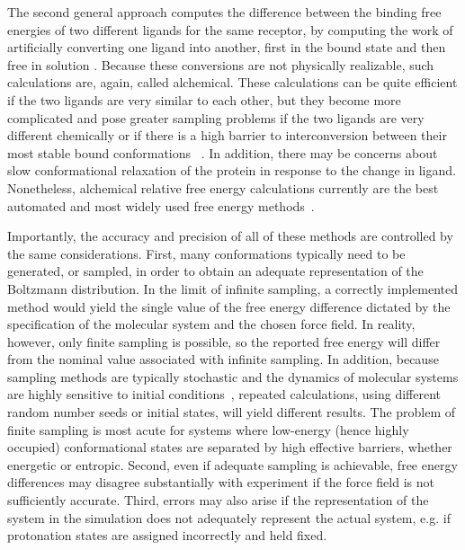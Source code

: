 \documentclass[aps,pre,twocolumn,nofootinbib,superscriptaddress,10pt, final,tightenlines]{revtex4-1}
\begin{document}
The second general approach computes the difference between the binding free energies of two different ligands for the same receptor, by computing the work of artificially converting one ligand into another, first in the bound state and then free in solution \cite{Tembe:1984:ComputChem, michel_prediction_2010, christ_basic_2010,  chodera_alchemical_2011}. 
Because these conversions are not physically realizable, such calculations are, again, called alchemical. These calculations can be quite efficient if the two ligands are very similar to each other, but they become more complicated and pose greater sampling problems if the two ligands are very different chemically or if there is a high barrier to interconversion between their most stable bound conformations ~\cite{liu_lead_2013}. 
In addition, there may be concerns about slow conformational relaxation of the protein in response to the change in ligand. 
Nonetheless, alchemical relative free energy calculations currently are the best automated and most widely used free energy methods~\cite{mobley_perspective_2012, liu_lead_2013, schrodinger_accurate_2015}.

Importantly, the accuracy and precision of all of these methods are controlled by the same considerations.
First, many conformations typically need to be generated, or sampled, in order to obtain an adequate representation of the Boltzmann distribution. 
In the limit of infinite sampling, a correctly implemented method would yield the single value of the free energy difference dictated by the specification of the molecular system and the chosen force field. 
In reality, however, only finite sampling is possible, so the reported free energy will differ from the nominal value associated with infinite sampling. 
In addition, because sampling methods are typically stochastic and the dynamics of molecular systems are highly sensitive to initial conditions~\cite{allen_computer_1989}, repeated calculations, using different random number seeds or initial states, will yield different results. 
The problem of finite sampling is most acute for systems where low-energy (hence highly occupied) conformational states are separated by high effective barriers, whether energetic or entropic. 
Second, even if adequate sampling is achievable, free energy differences may disagree substantially with experiment if the force field is not sufficiently accurate. 
Third, errors may also arise if the representation of the system in the simulation does not adequately represent the actual system, e.g. if protonation states are assigned incorrectly and held fixed.  
\end{document}
